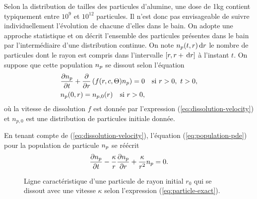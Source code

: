 Selon la distribution de tailles des particules d'alumine, une dose de
\num{1}\si{\kilo\gram} contient typiquement entre $10^9$ et $10^{12}$
particules. Il n'est donc pas envisageable de suivre individuellement
l'évolution de chacune d'elles dans le bain. On adopte une approche
statistique \cite{Hofer2011} et on décrit l'ensemble des particules
présentes dans le bain par l'intermédiaire d'une distribution
continue. On note $n_p(t, r)\,\mathrm dr$ le nombre de particules dont le
rayon est compris dans l'intervalle $[r, r + \,\mathrm dr]$ à l'instant
$t$. On suppose que cette population $n_p$ se dissout selon
l'équation
\begin{align}
&\frac{\partial n_p}{\partial t} + \frac{\partial
}{\partial r}\left( f(r,c,\Theta)n_p \right) = 0\quad \text{si } r > 0,\ t > 0,\label{eq:population-pde}\\
&n_p(0, r) = n_{p,0}(r) \quad \text{si } r > 0,\label{eq:population-ic}
\end{align}
où la vitesse de dissolution $f$ est donnée par l'expression
(\ref{eq:dissolution-velocity}) et $n_{p,0}$ est une distribution de
particules initiale donnée.

En tenant compte de (\ref{eq:dissolution-velocity}), l'équation
(\ref{eq:population-pde}) pour la population de particule
$n_p$ se réécrit
\begin{equation}\label{eq:population-pde-2}
  \frac{\partial n_p}{\partial t} -
  \frac{\kappa}{r}\frac{\partial n_p}{\partial r} +
  \frac{\kappa}{r^2}n_p = 0.
\end{equation}
\newcommand{\rcharacteristic}{R_{(\bar t, \bar r)}}

\begin{figure}
  \begin{center}
    
    \caption{Ligne caractéristique d'une particule de rayon initial
      $r_0$ qui se dissout avec une vitesse $\kappa$ selon
      l'expression (\ref{eq:particle-exact}).}
    \label{fig:characteristics}
  \end{center}
\end{figure}

